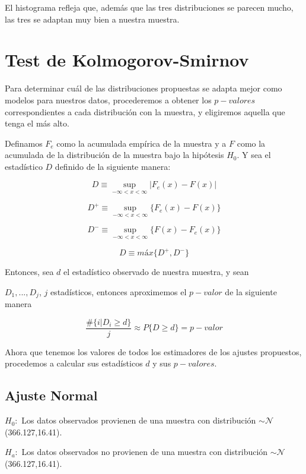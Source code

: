 \documentclass[a4paper,10pt]{article}
\begin{document}
El histograma refleja que, además que las tres distribuciones se parecen mucho, las tres se adaptan muy bien a nuestra muestra.

\pagebreak

\section*{Test de Kolmogorov-Smirnov}
\vspace{0.2in}

Para determinar cuál de las distribuciones propuestas se adapta mejor como modelos para nuestros datos, procederemos a obtener los $p-valores$ correspondientes
a cada distribución con la muestra, y eligiremos aquella que tenga el más alto.

Definamos $F_e$ como la acumulada empírica de la muestra y a $F$ como la acumulada de la distribución de la muestra bajo la hipótesis $H_0$.
Y sea el estadístico $D$ definido de la siguiente manera:

\[D \equiv \sup\limits_{-\infty < x < \infty} | F_e(x) - F(x)| \]

\[D^+ \equiv \sup\limits_{-\infty < x < \infty} \{F_e(x) - F(x)\}\]

\[D^- \equiv \sup\limits_{-\infty < x < \infty} \{F(x) - F_e(x)\}\]


\[D \equiv \textit{máx} \{D^+, D^-\} \]

Entonces, sea $d$ el estadístico observado de nuestra muestra, y sean

$D_1,...,D_j$, $j$ estadísticos, entonces aproximemos el $p-valor$ de la siguiente manera

\[\frac{\#\{i | D_i \geq d\}}{j} \approx P\{D \geq d\} = p-valor\]

Ahora que tenemos los valores de todos los estimadores de los ajustes propuestos, procedemos a calcular sus estadísticos $d$ y sus $p-valores$.

\subsection*{Ajuste Normal}

\vspace{0.2in}

$H_0:$ Los datos observados provienen de una muestra con distribución $\sim \mathcal{N}$(366.127,16.41).
\vspace{0.2in}

\noindent$H_a:$ Los datos observados no provienen de una muestra con distribución $\sim \mathcal{N}$(366.127,16.41).
\vspace{0.2in}
\end{document}

